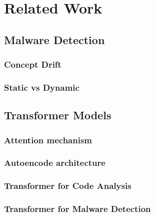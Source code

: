 \chapter{Related Work} %

\label{related_work} %


\section{Malware Detection}

\subsection{Concept Drift}

\subsection{Static vs Dynamic}

\section{Transformer Models}

\subsection{Attention mechanism}

\subsection{Autoencode architecture}

\subsection{Transformer for Code Analysis}

\subsection{Transformer for Malware Detection}